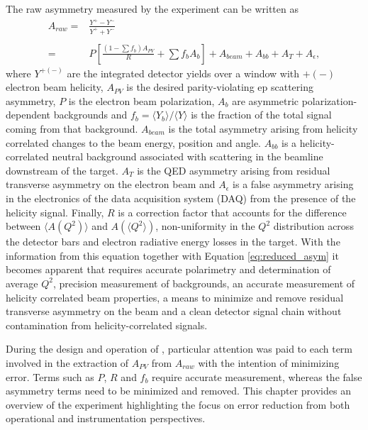The raw asymmetry measured by the \Qs experiment can be written as \cite{QweakNIM}
\begin{equation}
\begin{array}{rl}A_{raw}=&\frac{Y^+-Y^-}{Y^++Y^-}\\~&~\\=&P\left[\frac{(1-\sum f_b)A_{PV}}{R}+\sum f_bA_b\right]+A_{beam}+A_{bb}+A_T+A_{\epsilon},\end{array}
\label{eq:raw_asymmetry}
\end{equation} 
where $Y^{+(-)}$ are the integrated detector yields over a window with $+(-)$ electron beam helicity, $A_{PV}$ is the desired parity-violating ep scattering asymmetry, $P$ is the electron beam polarization, $A_b$ are asymmetric polarization-dependent backgrounds and $f_b=\langle Y_b \rangle/\langle Y \rangle$ is the fraction of the total signal coming from that background. $A_{beam}$ is the total asymmetry arising from helicity correlated changes to the beam energy, position and angle. $A_{bb}$ is a helicity-correlated neutral background associated with scattering in the beamline downstream of the target. $A_T$ is the QED asymmetry arising from residual transverse asymmetry on the electron beam and $A_{\epsilon}$ is a false asymmetry arising in the electronics of the data acquisition system (DAQ) from the presence of the helicity signal. Finally, $R$ is a correction factor that accounts for the difference between $\langle A(Q^2) \rangle$ and $A(\langle Q^2 \rangle)$, non-uniformity in the $Q^2$ distribution across the detector bars and electron radiative energy losses in the target. With the information from this equation together with Equation \ref{eq:reduced_asym} it becomes apparent that \Qs requires accurate polarimetry and determination of average $Q^2$, precision measurement of backgrounds, an accurate measurement of helicity correlated beam properties, a means to minimize and remove residual transverse asymmetry on the beam and a clean detector signal chain without contamination from helicity-correlated signals. 

During the design and operation of \Q, particular attention was paid to each term involved in the extraction of $A_{PV}$ from $A_{raw}$ with the intention of minimizing error. Terms such as $P$, $R$ and $f_b$ require accurate measurement, whereas the false asymmetry terms need to be minimized and removed.  This chapter 
provides an overview of the experiment highlighting the focus on error reduction from both operational and instrumentation perspectives.
 
